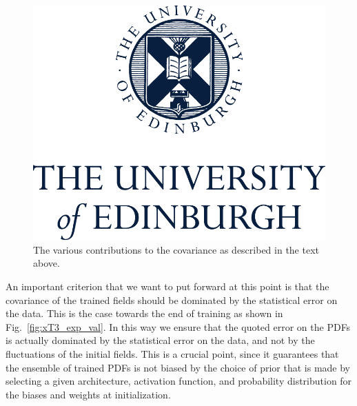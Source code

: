 \begin{figure}[ht!]
    \centering
    \includegraphics[scale=0.5]{plots/UoECentredLogo282v1160215.png}
    \caption{The various contributions to the covariance as described in the text above. 
    }
    \label{fig:CovarianceContribs}
\end{figure}



An important criterion that we want to put forward at this point is that the covariance of the trained
fields should be dominated by the statistical error on the data. This is the case towards the end of
training as shown in Fig.~\ref{fig:xT3_exp_val}. In this way we ensure that the quoted error 
on the PDFs is actually dominated by the statistical error on the data, and not by the fluctuations of the
initial fields. This is a crucial point, since it guarantees that the ensemble of trained PDFs is not biased by the
choice of prior that is made by selecting a given architecture, activation function, and probability distribution 
for the biases and weights at initialization. 

\FloatBarrier
